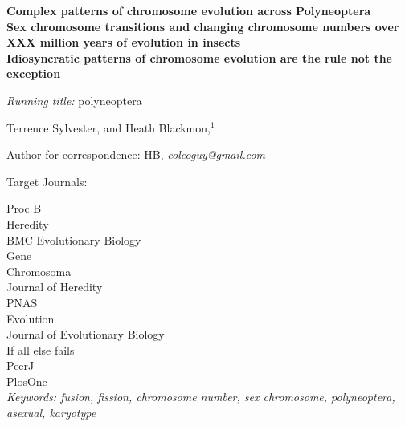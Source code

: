 \documentclass[12pt]{article}
\begin{document}
\linenumbers

\begin{center}
\textbf{Complex patterns of chromosome evolution across Polyneoptera}\\
\vspace{.5cm}
\textbf{Sex chromosome transitions and changing chromosome numbers over XXX million years of evolution in insects}\\
\vspace{.5cm}
\textbf{Idiosyncratic patterns of chromosome evolution are the rule not the exception}
\end{center}

\vfill
\noindent
\textit{Running title:} polyneoptera


\vfill
\noindent
Terrence Sylvester,
%
\noindent
and
Heath Blackmon,$^1$
\vfill


\theendnotes
\noindent
Author for correspondence: HB, \textit{coleoguy@gmail.com}
\vfill

\clearpage

 
\bigskip
\noindent

\noindent 
Target Journals:

\noindent 
Proc B\\
Heredity\\
BMC Evolutionary Biology\\
Gene\\
Chromosoma\\
Journal of Heredity\\
PNAS\\
Evolution\\
Journal of Evolutionary Biology\\

\noindent 
If all else fails \\
PeerJ\\
PlosOne\\

\noindent
\textit{Keywords: fusion, fission, chromosome number, sex chromosome, polyneoptera, asexual, karyotype}

\end{document}
